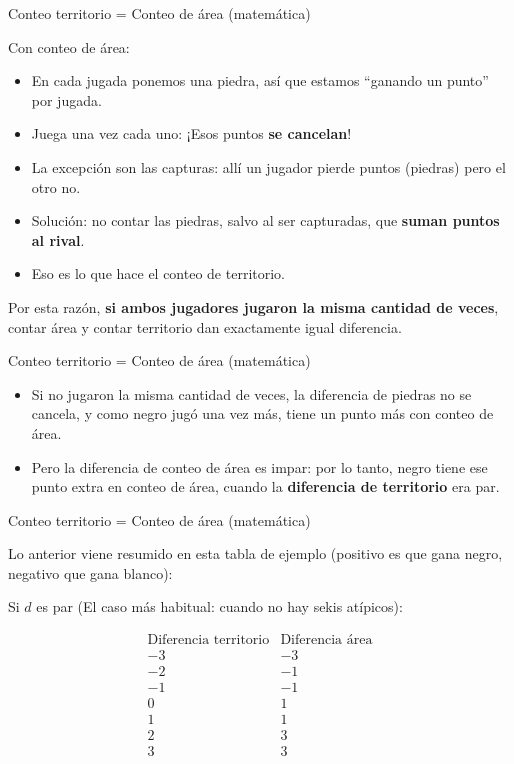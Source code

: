 \documentclass{beamer}
\begin{document}
\begin{frame}{Conteo territorio = Conteo de área (matemática)}
  
  Con conteo de área:
  \begin{itemize}
    \item En cada jugada ponemos una piedra, así que estamos ``ganando un punto'' por jugada.
    \item Juega una vez cada uno: ¡Esos puntos \textbf{se cancelan}!
    \item La excepción son las capturas: allí un jugador pierde puntos (piedras) pero el otro no.
    \item Solución: no contar las piedras, salvo al ser capturadas, que \textbf{suman puntos al rival}.
    \item Eso es lo que hace el conteo de territorio.
  \end{itemize}
  
  Por esta razón, \textbf{si ambos jugadores jugaron la misma cantidad de veces}, contar área y contar territorio dan exactamente igual diferencia.
  
\end{frame}


\begin{frame}{Conteo territorio = Conteo de área (matemática)}
  
  \begin{itemize}
      \item Si no jugaron la misma cantidad de veces, la diferencia de piedras no se cancela, y como negro jugó una vez más, tiene un punto más con conteo de área. 
  \end{itemize}
  
  \begin{itemize}
      \item Pero la diferencia de conteo de área es impar: por lo tanto, negro tiene ese punto extra en conteo de área, cuando la \textbf{diferencia de territorio} era par.
  \end{itemize}
\end{frame}

\begin{frame}{Conteo territorio = Conteo de área (matemática)}

Lo anterior viene resumido en esta tabla de ejemplo (positivo es que gana negro, negativo que gana blanco):
  
  Si $d$ es par (El caso más habitual: cuando no hay sekis atípicos):
  
  $$\begin{array}{cc}
      \mbox{Diferencia territorio} & \mbox{Diferencia área} \\
      -3 & -3 \\
      -2 & -1 \\
      -1 & -1 \\
      0 & 1 \\
      1 & 1 \\
      2 & 3 \\
      3 & 3 \\
  \end{array}$$

\end{frame}
\end{document}
